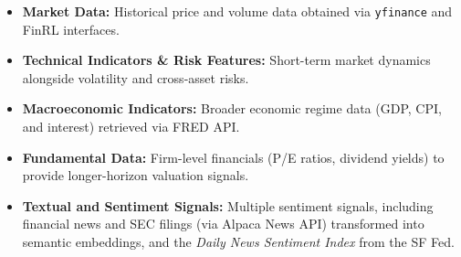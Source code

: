 \documentclass[10pt]{article}
\begin{document}
\begin{itemize}[noitemsep, topsep=3pt]

\item \textbf{Market Data:}
Historical price and volume data obtained via \texttt{yfinance} and FinRL interfaces.

\item \textbf{Technical Indicators \& Risk Features:}
Short-term market dynamics alongside volatility and cross-asset risks.

\item \textbf{Macroeconomic Indicators:}
Broader economic regime data (GDP, CPI, and interest) retrieved via FRED API.

\item \textbf{Fundamental Data:}
Firm-level financials (P/E ratios, dividend yields) to provide longer-horizon valuation signals.

\item \textbf{Textual and Sentiment Signals:}
Multiple sentiment signals, including financial news and SEC filings (via Alpaca News API) transformed into semantic embeddings, and the \textit{Daily News Sentiment Index} from the SF Fed.
\end{itemize}
\end{document}
